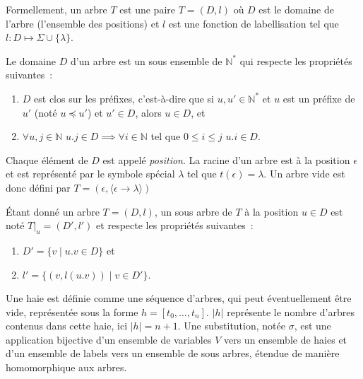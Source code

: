 \begin{definition}[Arbre]
    Formellement, un arbre $T$ est une paire $T = (D, l)$ où $D$ est le domaine de l'arbre (l'ensemble des positions) et $l$ est une fonction de labellisation
    tel que $l : D \mapsto \Sigma \cup \{\lambda\}$.

    Le domaine $D$ d'un arbre est un sous ensemble de $\mathbb{N}^*$ qui respecte les propriétés suivantes :
    \begin{enumerate}
        \item $D$ est clos sur les préfixes, c'est-à-dire que si $u, u' \in \mathbb{N}^*$ et $u$ est un préfixe de $u'$ (noté $u \preceq u'$) et $u' \in D$, alors $u \in D$, et
        \item $\forall u, j \in \mathbb{N}$ $u.j \in D \implies \forall i \in \mathbb{N}$ tel que $0 \leq i \leq j$ $ u.i \in D$.
    \end{enumerate}
    Chaque élément de $D$ est appelé \emph{position}.
    La racine d'un arbre est à la position $\epsilon$ et est représenté par le symbole spécial $\lambda$ tel que $t(\epsilon) = \lambda$.
    Un arbre vide est donc défini par  $T = (\epsilon, \langle \epsilon \to \lambda \rangle)$
\end{definition}

\begin{definition}
    Étant donné un arbre $T = (D, l)$, un sous arbre de $T$ à la position $u \in D$ est noté $T|_u = (D', l')$ et respecte les propriétés suivantes :
    \begin{enumerate}
        \item $D' = \{v \mid u.v \in D\}$ et
        \item $l' = \{(v, l(u.v)) \mid v \in D'\}$.
    \end{enumerate}
\end{definition}

\begin{definition}[Haie]
    Une haie est définie comme une séquence d'arbres, qui peut éventuellement être vide, représentée sous la forme $h = [t_0, \dots , t_n]$.
    $|h|$ représente le nombre d'arbres contenus dans cette haie, ici $|h| = n + 1$.
    Une substitution, notée $\sigma$, est une application bijective d'un ensemble de variables $V$ vers un ensemble de haies et d'un ensemble de labels vers un ensemble de sous arbres, étendue de manière homomorphique aux arbres.
\end{definition}

